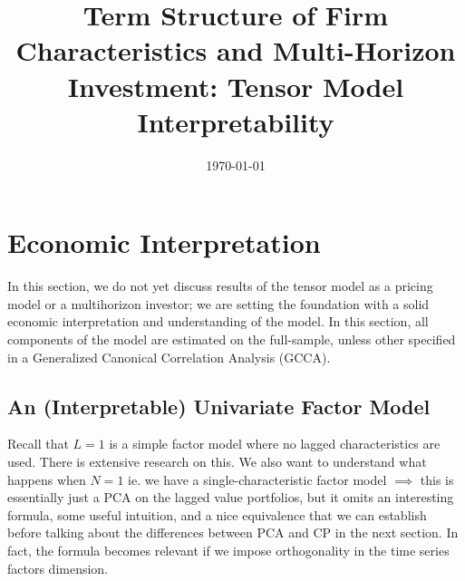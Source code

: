 \documentclass{article}
\title{Term Structure of Firm Characteristics and Multi-Horizon Investment: Tensor Model Interpretability}
\date{\today}
\begin{document}
\maketitle

\tableofcontents

\listoffigures

\newpage

\section{Economic Interpretation}

In this section, we do not yet discuss results of the tensor model as a pricing model or a multihorizon investor; 
we are setting the foundation with a solid economic interpretation and understanding of the model. In this section, all
components of the model are estimated on the full-sample, unless other specified in a Generalized Canonical Correlation Analysis (GCCA). 


\subsection{An (Interpretable) Univariate Factor Model}

Recall that $L = 1$ is a simple factor model where no lagged characteristics are used. There is extensive research on this. 
We also want to understand what happens when $N = 1$ ie. we have a single-characteristic factor model $\implies$
this is essentially just a PCA on the lagged value portfolios, but it omits an interesting formula, some useful intuition, and a nice equivalence 
that we can establish before talking about the differences between PCA and CP in the next section. In fact, the formula becomes relevant if we impose orthogonality in the time series factors dimension. 
\end{document}
